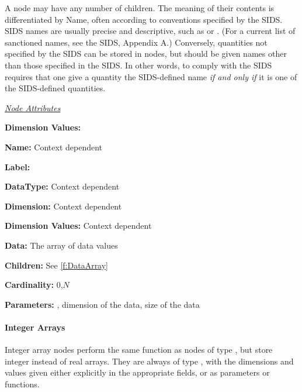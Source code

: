 A node may have any number of  children. The
meaning of their contents is differentiated by Name, often
according to conventions specified by the SIDS. SIDS names are
usually precise and descriptive, such as  or
. (For a current list of sanctioned names, see the
SIDS, Appendix A.) Conversely, quantities not specified by the SIDS can
be stored in  nodes, but should be given names other
than those specified in the SIDS. In other words, to comply with the
SIDS requires that one give a quantity the SIDS-defined name \emph{if
and only if} it is one of the SIDS-defined quantities.

\textit{\uline{Node Attributes}}
\begin{Ventryic}{\textbf{Dimension Values:}}
\item [\textbf{Name:}]
      Context dependent
\item [\textbf{Label:}]
\item [\textbf{DataType:}]
      Context dependent
\item [\textbf{Dimension:}]
      Context dependent
\item [\textbf{Dimension Values:}]
      Context dependent
\item [\textbf{Data:}]
      The array of data values
\item [\textbf{Children:}]
      See \autoref{f:DataArray}
\item [\textbf{Cardinality:}]
      0,$N$
\item [\textbf{Parameters:}]
      , dimension of the data, size of the data
\end{Ventryic}

\paragraph{Integer Arrays}

Integer array nodes perform the same function as nodes of type
, but store integer instead of real arrays. They are
always of type , with the dimensions and values given either
explicitly in the appropriate fields, or as parameters or functions.

